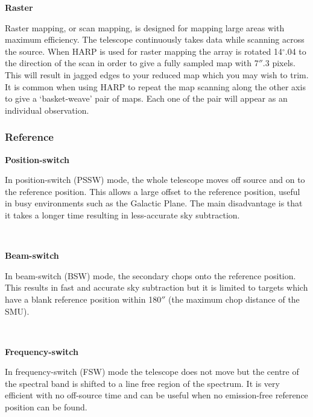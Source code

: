 \documentclass[twoside,11pt]{article}
\renewcommand{\_}{\texttt{\symbol{95}}}
\begin{document}
\begin{minipage}[t]{0.14\linewidth}
\textbf{Raster}
\end{minipage}
\begin{minipage}[t]{0.85\linewidth}
Raster mapping, or scan mapping, is designed for mapping large areas with maximum efficiency. The telescope continuously takes data while scanning across the source. When HARP is used for raster mapping the array is rotated 14$^\circ$.04 to the direction of the scan in order to give a fully sampled map with 7$''$.3 pixels. This will result in jagged edges to your reduced map which you may wish to trim. It is common when using HARP to repeat the map scanning along the other axis to give a `basket-weave'  pair of maps. Each one of the pair will appear as an individual observation.
\end{minipage}

\subsubsection{Reference}
\begin{minipage}[t]{0.14\linewidth}
\textbf{Position-switch}
\end{minipage}
\begin{minipage}[t]{0.85\linewidth}
In position-switch (PSSW) mode, the whole telescope moves off source and on to the reference position. This allows a large offset to the reference position, useful in busy environments such as the Galactic Plane. The main disadvantage is that it takes a longer time resulting in less-accurate sky subtraction. 
\end{minipage}
\vspace{0.7cm}\\
\begin{minipage}[t]{0.14\linewidth}
\textbf{Beam-switch}
\end{minipage}
\begin{minipage}[t]{0.85\linewidth}
In beam-switch (BSW) mode, the secondary chops onto the reference position. This results in fast and accurate sky subtraction but it is limited to targets which have a blank reference position within 180$''$ (the maximum chop distance of the SMU).
\end{minipage}
\vspace{0.7cm}\\
\begin{minipage}[t]{0.14\linewidth}
\textbf{Frequency-switch}
\end{minipage}
\begin{minipage}[t]{0.85\linewidth}
In frequency-switch (FSW) mode the telescope does not move but the centre of the spectral band is shifted to a line free region of the spectrum. It is very efficient with no off-source time and can be useful  when no emission-free reference position can be found. 
\end{minipage}
\end{document}
